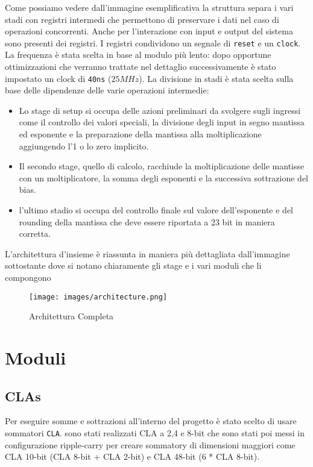 \documentclass[twoside,11pt]{article}
\begin{document}
{Come possiamo vedere dall'immagine esemplificativa la struttura separa i vari stadi con registri intermedi che permettono di preservare i dati nel caso di operazioni concorrenti.
Anche per l’interazione con input e output del sistema sono presenti dei registri.
I registri condividono un segnale di \verb|reset| e un \verb|clock|. La frequenza è stata scelta in base al modulo più lento: dopo opportune ottimizzazioni che verranno trattate nel dettaglio successivamente è stato impostato un clock di \verb|40ns| ($25 MHz$).
La divisione in stadi è stata scelta sulla base delle dipendenze delle varie operazioni intermedie:
\begin{itemize}
    \item Lo stage di setup si occupa delle azioni preliminari da svolgere sugli ingressi come il controllo dei valori speciali, la divisione degli input in segno mantissa ed esponente e la preparazione della mantissa alla moltiplicazione aggiungendo l’1 o lo zero implicito.
    \item Il secondo stage, quello di calcolo, racchiude la moltiplicazione delle mantisse con un moltiplicatore, la somma degli esponenti e la successiva sottrazione del bias.
    \item l’ultimo stadio si occupa del controllo finale sul valore dell'esponente e del rounding della mantissa che deve essere riportata a 23 bit in maniera corretta.
\end{itemize}

L’architettura d’insieme è riassunta in maniera più dettagliata dall'immagine sottostante dove si notano chiaramente gli stage e i vari moduli che li compongono

\begin{figure}[h!]
    \centering
    \texttt{[image: images/architecture.png]}
    \caption{Architettura Completa}
    \label{fig:architecture}
\end{figure}

\newpage

\section{Moduli}
\subsection{CLAs}
Per eseguire somme e sottrazioni all'interno del progetto è stato scelto di usare sommatori \verb|CLA|. sono stati realizzati CLA a 2,4 e 8-bit che sono stati poi messi in configurazione ripple-carry per creare sommatory di dimensioni maggiori come CLA 10-bit (CLA 8-bit + CLA 2-bit) e CLA 48-bit (6 * CLA 8-bit).

}
\end{document}
